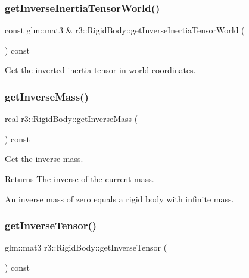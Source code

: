 \subsubsection{\texorpdfstring{get\+Inverse\+Inertia\+Tensor\+World()}{getInverseInertiaTensorWorld()}\hspace{0.1cm}{\footnotesize\ttfamily [2/2]}}
{\footnotesize\ttfamily const glm\+::mat3 \& r3\+::\+Rigid\+Body\+::get\+Inverse\+Inertia\+Tensor\+World (\begin{DoxyParamCaption}{ }\end{DoxyParamCaption}) const}



Get the inverted inertia tensor in world coordinates. 

\mbox{\label{classr3_1_1_rigid_body_a9a994b91ccc980c1dcc4ed43f71b6913}} 
\subsubsection{\texorpdfstring{get\+Inverse\+Mass()}{getInverseMass()}}
{\footnotesize\ttfamily \mbox{\hyperlink{namespacer3_ab2016b3e3f743fb735afce242f0dc1eb}{real}} r3\+::\+Rigid\+Body\+::get\+Inverse\+Mass (\begin{DoxyParamCaption}{ }\end{DoxyParamCaption}) const}



Get the inverse mass. 

\begin{DoxyReturn}{Returns}
The inverse of the current mass.
\end{DoxyReturn}
An inverse mass of zero equals a rigid body with infinite mass. \mbox{\label{classr3_1_1_rigid_body_a8a99ed119357d0cec8b77dfcb169dfab}} 
\subsubsection{\texorpdfstring{get\+Inverse\+Tensor()}{getInverseTensor()}}
{\footnotesize\ttfamily glm\+::mat3 r3\+::\+Rigid\+Body\+::get\+Inverse\+Tensor (\begin{DoxyParamCaption}{ }\end{DoxyParamCaption}) const}



